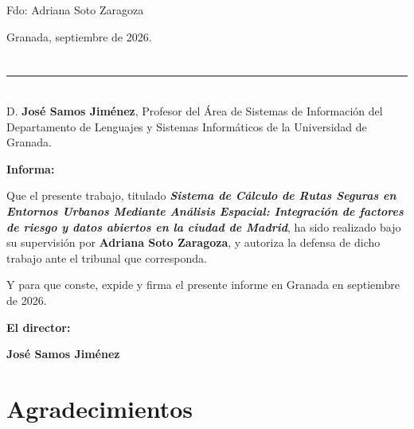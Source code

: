 \vspace{6cm}

\noindent Fdo: Adriana Soto Zaragoza

\vspace{2cm}

\begin{flushright}
Granada, septiembre de 2026.
\end{flushright}


\chapter*{}
\thispagestyle{empty}

\noindent\rule[-1ex]{\textwidth}{2pt}\\[4.5ex]

D. \textbf{José Samos Jiménez}, Profesor del Área de Sistemas de Información del Departamento de Lenguajes y Sistemas Informáticos de la Universidad de Granada.


\vspace{0.5cm}

\textbf{Informa:}

\vspace{0.5cm}

Que el presente trabajo, titulado \textit{\textbf{Sistema de Cálculo de Rutas Seguras en Entornos Urbanos Mediante Análisis Espacial: Integración de factores de riesgo y datos abiertos en la ciudad de Madrid}},
ha sido realizado bajo su supervisión por \textbf{Adriana Soto Zaragoza}, y autoriza la defensa de dicho trabajo ante el tribunal
que corresponda.

\vspace{0.5cm}

Y para que conste, expide y firma el presente informe en Granada en septiembre de 2026.

\vspace{1cm}

\textbf{El director:}

\vspace{5cm}

\noindent \textbf{José Samos Jiménez}

\setlength{\parskip}{6pt}
\chapter*{Agradecimientos}
\thispagestyle{empty}

       \vspace{1cm}



